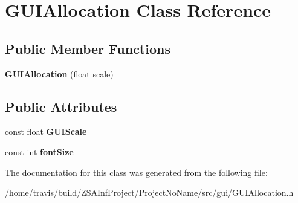 \hypertarget{classGUIAllocation}{\section{G\-U\-I\-Allocation Class Reference}
\label{classGUIAllocation}
}
\subsection*{Public Member Functions}
\begin{DoxyCompactItemize}
\item 
\hypertarget{classGUIAllocation_ab08f266892caef0e345ed4c7c60d50d0}{{\bfseries G\-U\-I\-Allocation} (float scale)}\label{classGUIAllocation_ab08f266892caef0e345ed4c7c60d50d0}

\end{DoxyCompactItemize}
\subsection*{Public Attributes}
\begin{DoxyCompactItemize}
\item 
\hypertarget{classGUIAllocation_ae9d57188f6029e0dbdeac997a146a240}{const float {\bfseries G\-U\-I\-Scale}}\label{classGUIAllocation_ae9d57188f6029e0dbdeac997a146a240}

\item 
\hypertarget{classGUIAllocation_a8bb72d04027ef70d3a1b02cd061f05dc}{const int {\bfseries font\-Size}}\label{classGUIAllocation_a8bb72d04027ef70d3a1b02cd061f05dc}

\end{DoxyCompactItemize}


The documentation for this class was generated from the following file\-:\begin{DoxyCompactItemize}
\item 
/home/travis/build/\-Z\-S\-A\-Inf\-Project/\-Project\-No\-Name/src/gui/G\-U\-I\-Allocation.\-h\end{DoxyCompactItemize}
